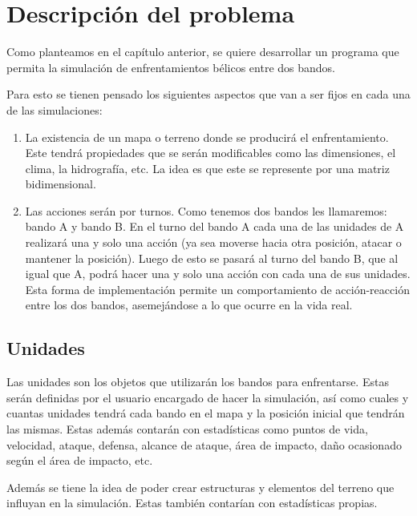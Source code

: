 \chapter{Descripción del problema}

Como planteamos en el cap\'itulo anterior, se quiere desarrollar un programa que permita la simulaci\'on de enfrentamientos b\'elicos entre dos bandos.

Para esto se tienen pensado los siguientes aspectos que van a ser fijos en cada una de las simulaciones:

\begin{enumerate}
	\item La existencia de un mapa o terreno donde se producir\'a el enfrentamiento. Este tendr\'a propiedades que se ser\'an modificables como las dimensiones, el clima, la hidrograf\'ia, etc. La idea es que este se represente por una matriz bidimensional.
	
	\item Las acciones ser\'an por turnos. Como tenemos dos bandos les llamaremos: bando A y bando B. En el turno del bando A cada una de las unidades de A realizar\'a una y solo una acci\'on (ya sea moverse hacia otra posici\'on, atacar o mantener la posici\'on). Luego de esto se pasar\'a al turno del bando B, que al igual que A, podr\'a hacer una y solo una acci\'on con cada una de sus unidades. Esta forma de implementaci\'on permite un comportamiento de acci\'on-reacci\'on entre los dos bandos, asemej\'andose a lo que ocurre en la vida real.
	
\end{enumerate}

\section{Unidades}

Las unidades son los objetos que utilizar\'an los bandos para enfrentarse. Estas ser\'an definidas por el usuario encargado de hacer la simulaci\'on, as\'i como cuales y cuantas unidades tendr\'a cada bando en el mapa y la posici\'on inicial que tendr\'an las mismas. Estas adem\'as contar\'an con estad\'isticas como puntos de vida, velocidad, ataque, defensa, alcance de ataque, \'area de impacto, daño ocasionado seg\'un el \'area de impacto, etc.

Adem\'as se tiene la idea de poder crear estructuras y elementos del terreno que influyan en la simulaci\'on. Estas tambi\'en contar\'ian con estad\'isticas propias.

